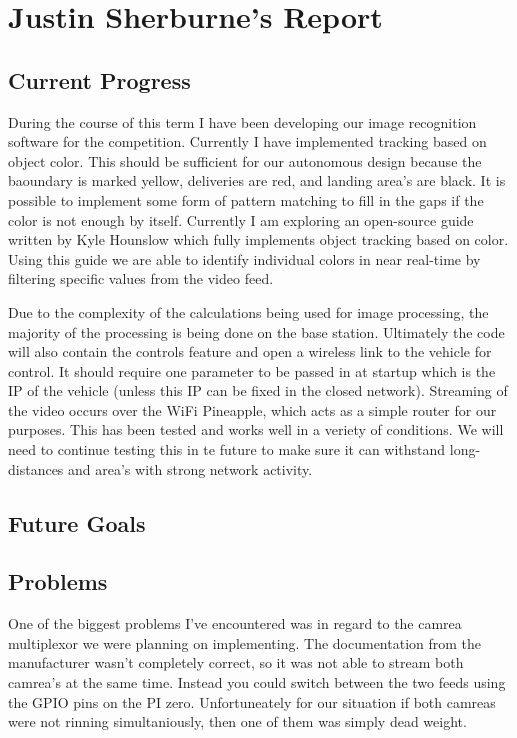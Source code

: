 \documentclass[onecolumn, draftclsnofoot,10pt, compsoc]{IEEEtran}
\begin{document}
\section{Justin Sherburne's Report}

\subsection{Current Progress}

During the course of this term I have been developing our image recognition software for the competition. Currently I have implemented tracking based on object color. This should be sufficient for our autonomous design because the baoundary is marked yellow, deliveries are red, and landing area's are black. It is possible to implement some form of pattern matching to fill in the gaps if the color is not enough by itself. Currently I am exploring an open-source guide written by Kyle Hounslow which fully implements object tracking based on color. Using this guide we are able to identify individual colors in near real-time by filtering specific values from the video feed.

Due to the complexity of the calculations being used for image processing, the majority of the processing is being done on the base station. Ultimately the code will also contain the controls feature and open a wireless link to the vehicle for control. It should require one parameter to be passed in at startup which is the IP of the vehicle (unless this IP can be fixed in the closed network). Streaming of the video occurs over the WiFi Pineapple, which acts as a simple router for our purposes. This has been tested and works well in a veriety of conditions. We will need to continue testing this in te future to make sure it can withstand long-distances and area's with strong network activity.


\subsection{Future Goals}



\subsection{Problems}

One of the biggest problems I've encountered was in regard to the camrea multiplexor we were planning on implementing. The documentation from the manufacturer wasn't completely correct, so it was not able to stream both camrea's at the same time. Instead you could switch between the two feeds using the GPIO pins on the PI zero. Unfortuneately for our situation if both camreas were not rinning simultaniously, then one of them was simply dead weight.
\end{document}

